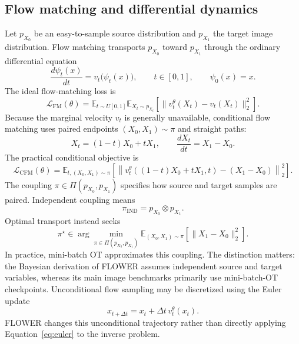 \documentclass[11pt,a4paper]{article}
\newcommand{\E}{\mathbb{E}}
\newcommand{\Dx}{\Delta t}
\begin{document}
\subsection{Flow matching and differential dynamics}
Let $p_{X_0}$ be an easy-to-sample source distribution and
$p_{X_1}$ the target image distribution.
Flow matching transports $p_{X_0}$ toward $p_{X_1}$ through the
ordinary differential equation
\begin{equation}
    \frac{d\psi_t(x)}{dt}
    =
    v_t\bigl(\psi_t(x)\bigr),
    \qquad
    t\in[0,1],
    \qquad
    \psi_0(x)=x.
    \label{eq:flowode}
\end{equation}
The ideal flow-matching loss is
\begin{equation}
    \mathcal L_{\mathrm{FM}}(\theta)
    =
    \E_{t\sim U[0,1]}
    \E_{X_t\sim p_{X_t}}
    \left[
        \|v_t^\theta(X_t)-v_t(X_t)\|_2^2
    \right].
    \label{eq:fm}
\end{equation}
Because the marginal velocity $v_t$ is generally unavailable,
conditional flow matching uses paired endpoints
$(X_0,X_1)\sim\pi$ and straight paths:
\begin{equation}
    X_t
    =
    (1-t)X_0+tX_1,
    \qquad
    \frac{dX_t}{dt}
    =
    X_1-X_0.
    \label{eq:straight}
\end{equation}
The practical conditional objective is
\begin{equation}
    \mathcal L_{\mathrm{CFM}}(\theta)
    =
    \E_{t,(X_0,X_1)\sim\pi}
    \left[
        \left\|
        v_t^\theta((1-t)X_0+tX_1,t)
        -
        (X_1-X_0)
        \right\|_2^2
    \right].
    \label{eq:cfm}
\end{equation}
The coupling $\pi\in\Pi(p_{X_0},p_{X_1})$ specifies how source
and target samples are paired.
Independent coupling means
\begin{equation}
    \pi_{\mathrm{IND}}
    =
    p_{X_0}\otimes p_{X_1}.
    \label{eq:ind}
\end{equation}
Optimal transport instead seeks
\begin{equation}
    \pi^\star
    \in
    \arg\min_{\pi\in\Pi(p_{X_0},p_{X_1})}
    \E_{(X_0,X_1)\sim\pi}
    \left[
        \|X_1-X_0\|_2^2
    \right].
    \label{eq:ot}
\end{equation}
In practice, mini-batch OT approximates this coupling.
The distinction matters: the Bayesian derivation of FLOWER assumes
independent source and target variables, whereas its main image
benchmarks primarily use mini-batch-OT checkpoints.
Unconditional flow sampling may be discretized using the Euler update
\begin{equation}
    x_{t+\Dx}
    =
    x_t
    +
    \Dx\,v_t^\theta(x_t).
    \label{eq:euler}
\end{equation}
FLOWER changes this unconditional trajectory rather than directly
applying Equation~\eqref{eq:euler} to the inverse problem.
\end{document}
